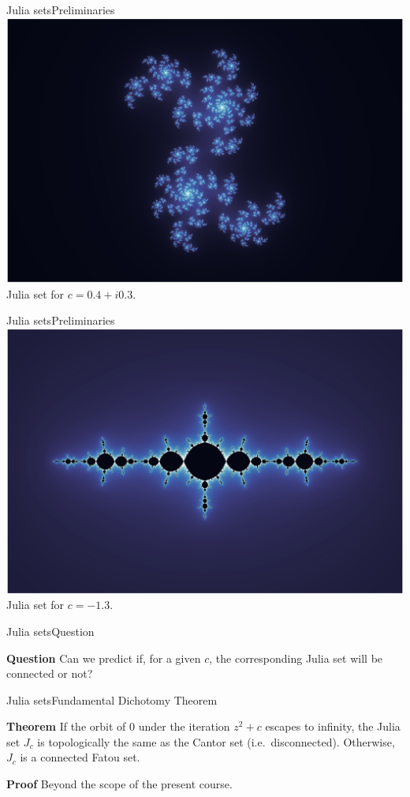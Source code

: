 \documentclass[usenames,dvipsnames,svgnames,10pt,aspectratio=169]{beamer}
\begin{document}
\begin{frame}[t, c]{Julia sets}{Preliminaries}
	\centering
	\includegraphics[width=.6\textwidth]{Julia_set_4} \\
	\medskip
	Julia set for $c = 0.4 + i0.3$.
	\vspace{1cm}
\end{frame}

\begin{frame}[t, c]{Julia sets}{Preliminaries}
	\centering
	\includegraphics[width=.6\textwidth]{Julia_set_5} \\
	\medskip
	Julia set for $c = -1.3$.
	\vspace{1cm}
\end{frame}

\begin{frame}[t, c]{Julia sets}{Question}
	\centering
	\begin{block}{\centering \textbf{Question}}
		\centering
		Can we predict if, for a given $c$, the corresponding Julia set will be connected or not?
	\end{block}
	\vspace{1cm}
\end{frame}

\begin{frame}[t, c]{Julia sets}{Fundamental Dichotomy Theorem}
	\centering
	\begin{block}{\centering \textbf{Theorem}}
		If the orbit of $0$ under the iteration $z^2 + c$ escapes to infinity, the Julia set $J_c$ is topologically the same as the Cantor set (i.e.\ disconnected). Otherwise, $J_c$ is a connected Fatou set.
	\end{block}

	\bigskip

	\begin{block}{\centering \textbf{Proof}}
		\centering
		Beyond the scope of the present course.
	\end{block}

	\vspace{1cm}
\end{frame}
\end{document}
